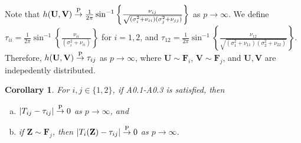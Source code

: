 \documentclass[twoside]{article}
\newcommand{\bZ}{\mathbf{Z}}
\newcommand{\bF}{\mathbf{F}}
\newcommand{\bU}{\mathbf{U}}
\newcommand{\bV}{\mathbf{V}}
\newcommand{\0}{\mathbf{0}}
\newcommand{\1}{\mathbf{1}}
\numberwithin{equation}{section}
\newtheorem{cor}[thm]{Corollary}
\begin{document}
Note that $h(\bU,\bV)\stackrel{\rm P}{\to}\frac{1}{2\pi}\sin^{-1}\left \{\frac{\nu_{ij}}{\sqrt{(\sigma^2_i+\nu_{ii})(\sigma^2_j+\nu_{jj})}}\right\}$ as $p\to\infty$. We define $\tau_{ii}=\frac{1}{2\pi}\sin^{-1}\left \{\frac{\nu_{ii}}{(\sigma^2_i + \nu_{ii})}\right\}$ for $i=1,2$, and $\tau_{12}=\frac{1}{2\pi}\sin^{-1}\left \{\frac{\nu_{12}}{\sqrt{(\sigma^2_1 + \nu_{11})(\sigma^2_2 + \nu_{22})}}\right\}$. Therefore, $h(\bU,\bV)\stackrel{\rm P}{\to}\tau_{ij}$ as $p\to\infty$, where $\bU\sim\bF_i$, $\bV\sim\bF_j$, and $\bU,\bV$ are indepedently distributed.
\begin{cor}\label{L0}
 For $i,j\in\{1,2\}$, if {\rm A0.1-A0.3} is satisfied, then
 \begin{enumerate}[(a)]
  \item $|T_{ij}-\tau_{ij}|\stackrel{\rm P}{\to}0$ as $p\to\infty $, and
  \item if $\bZ\sim \bF_j$, then $|T_{i}(\bZ)-\tau_{ij}|\stackrel{\rm P}{\to}0$ as $p\to\infty $.
 \end{enumerate}
\end{cor}
\end{document}
